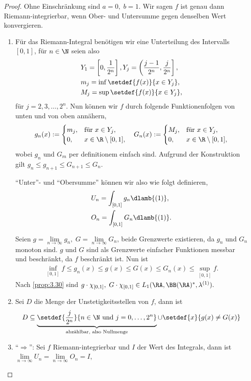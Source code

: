 \begin{proof}
Ohne Einschränkung sind $a=0,\;b=1$. Wir sagen $f$ ist genau dann
Riemann-integrierbar, wenn Ober- und Untersumme gegen denselben Wert
konvergieren.

\begin{enumerate}[label=\arabic{*}.)]
  \item Für das Riemann-Integral benötigen wir eine Unterteilung des 
Intervalls $[0,1]$, für $n\in\N$ seien also
\begin{align*}
&Y_1 = \left[0,\frac{1}{2^n}\right], Y_j =
\left(\frac{j-1}{2^n},\frac{j}{2^n}\right],
\\ &m_j = \inf \setdef{f(x)}{x\in
Y_j},\\ &M_j = \sup \setdef{f(x)}{x\in Y_j},
\end{align*}
für $j=2,3,\ldots,2^n$. Nun können wir $f$ durch folgende Funktionenfolgen von
unten und von oben annähern,
\begin{align*}
g_n(x) := \begin{cases}m_j, & \text{für }x\in Y_j,\\0, &
  x\in\R\setminus[0,1],\end{cases}\quad G_n(x) := \begin{cases}M_j, & \text{für }x\in Y_j,\\0, &
  x\in\R\setminus[0,1],\end{cases}
\end{align*}
wobei $g_n$ und $G_m$ per definitionem einfach sind. Aufgrund der Konstruktion
gilt $g_n \le g_{n+1} \le G_{n+1} \le G_n$.

``Unter''- und ``Obersumme'' können wir also wie folgt definieren,
\begin{align*}
&U_n = \int_{[0,1]} g_n \dlamb{(1)},\\
&O_n = \int_{[0,1]} G_n \dlamb{(1)}.
\end{align*}

Seien $g = \lim\limits_{n\to\infty} g_n,\; G = \lim\limits_{n\to\infty} G_n$,
beide Grenzwerte existieren, da $g_n$ und $G_n$ monoton sind. $g$ und $G$ sind
als Grenzwerte einfacher Funktionen messbar und beschränkt, da $f$ beschränkt
ist. Nun ist
\begin{align*}
\inf_{[0,1]} f \le g_n(x) \le g(x) \le G(x) \le G_n(x) \le \sup_{[0,1]} f.
\end{align*}
Nach \ref{prop:3.30} sind
$g\cdot \chi_{[0,1]},\; G\cdot \chi_{[0,1]} \in
L_1(\RA,\BB(\RA)^*,\lambda^{(1)}). $
\item Sei $D$ die Menge der Unstetigkeitsstellen von $f$, dann ist
\begin{align*}
D \subseteq\underbrace{\setdef{\frac{j}{2^n}}{n\in\N\text{ und
}j=0,\ldots,2^n}}_{\text{abzählbar, also Nullmenge}}\cup\setdef{x}{g(x)\neq
G(x)}
\end{align*}
\item ``$\Rightarrow$'': Sei $f$ Riemann-integrierbar und $I$ der Wert des
Integrals, dann ist $\lim\limits_{n\to\infty} U_n = \lim\limits_{n\to\infty} O_n
= I$,


\end{enumerate}
\end{proof}
